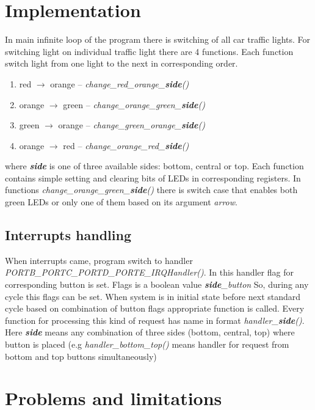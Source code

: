 \documentclass[12pt,a4paper]{article}
\begin{document}
    \section{Implementation}
    In main infinite loop of the program there is switching of all car traffic lights.
    For switching light on individual traffic light there are 4 functions.
    Each function switch light from one light to the next in corresponding order.
    \begin{enumerate}
        \item red $\rightarrow$ orange -- \textit{change\_red\_orange\_\textbf{side}()}
        \item orange $\rightarrow$ green -- \textit{change\_orange\_green\_\textbf{side}()}
        \item green $\rightarrow$ orange -- \textit{change\_green\_orange\_\textbf{side}()}
        \item orange $\rightarrow$ red -- \textit{change\_orange\_red\_\textbf{side}()}
    \end{enumerate}
    where \textit{\textbf{side}} is one of three available sides: bottom, central or top.
    Each function contains simple setting and clearing bits of LEDs in corresponding registers.
    In functions \textit{change\_orange\_green\_\textbf{side}()} there is switch case that enables both green LEDs or only one of them based on its argument \textit{arrow}.
    
    \subsection*{Interrupts handling}
    When interrupts came, program switch to handler \textit{PORTB\_PORTC\_PORTD\_PORTE\_IRQHandler()}.
    In this handler flag for corresponding button is set.
    Flags is a boolean value \textit{\textbf{side}\_button}
    So, during any cycle this flags can be set.
    When system is in initial state before next standard cycle based on combination of button flags appropriate function is called.
    Every function for processing this kind of request has name in format \textit{handler\_\textbf{side}()}.
    Here \textit{\textbf{side}} means any combination of three sides (bottom, central, top) where button is placed (e.g \textit{handler\_bottom\_top()} means handler for request from bottom and top buttons simultaneously)
    
    \section{Problems and limitations}
\end{document}
